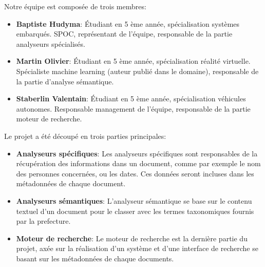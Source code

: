 Notre équipe est composée de trois membres:
\begin{itemize}
\item \textbf{Baptiste Hudyma}:
Étudiant en 5 ème année, spécialisation systèmes embarqués.
SPOC, représentant de l'équipe, responsable de la partie analyseurs spécialisés. 

\item \textbf{Martin Olivier}: 
Étudiant en 5 ème année, spécialisation réalité virtuelle.
Spécialiste machine learning (auteur publié dans le domaine), responsable de la partie d'analyse sémantique.

\item \textbf{Staberlin Valentain}:
Étudiant en 5 ème année, spécialisation véhicules autonomes.
Responsable management de l'équipe, responsable de la partie moteur de recherche.

\end{itemize}


Le projet a été découpé en trois parties principales:
\begin{itemize}
\item \textbf{Analyseurs spécifiques}: 
Les analyseurs spécifiques sont responsables de la récupération des informations dans un document, comme par exemple le nom des personnes concernées, ou les dates.
Ces données seront incluses dans les métadonnées de chaque document.

\item \textbf{Analyseurs sémantiques}:
L'analyseur sémantique se base sur le contenu textuel d'un document pour le classer avec les termes taxonomiques fournis par la prefecture.

\item \textbf{Moteur de recherche}:
Le moteur de recherche est la dernière partie du projet, axée sur la réalisation d'un système et d'une interface de recherche se basant sur les métadonnées de chaque documents.

\end{itemize}
